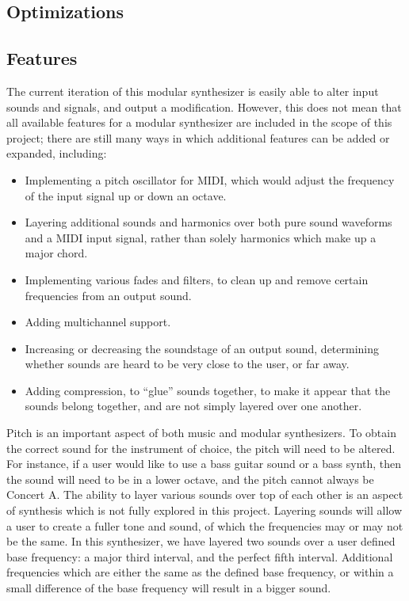 \subsection{Optimizations}

\subsection{Features}

The current iteration of this modular synthesizer is easily able to alter input sounds and signals, and output a modification. However, this does not mean that all available features for a modular synthesizer are included in the scope of this project; there are still many ways in which additional features can be added or expanded, including:

\begin{itemize}
	\item Implementing a pitch oscillator for MIDI, which would adjust the frequency of the input signal up or down an octave.
	\item Layering additional sounds and harmonics over both pure sound waveforms and a MIDI input signal, rather than solely harmonics which make up a major chord.
	\item Implementing various fades and filters, to clean up and remove certain frequencies from an output sound.
	\item Adding multichannel support. 
	\item Increasing or decreasing the soundstage of an output sound, determining whether sounds are heard to be very close to the user, or far away.
	\item Adding compression, to ``glue'' sounds together, to make it appear that the sounds belong together, and are not simply layered over one another.
\end{itemize}

Pitch is an important aspect of both music and modular synthesizers. To obtain the correct sound for the instrument of choice, the pitch will need to be altered. For instance, if a user would like to use a bass guitar sound or a bass synth, then the sound will need to be in a lower octave, and the pitch cannot always be Concert A. The ability to layer various sounds over top of each other is an aspect of synthesis which is not fully explored in this project. Layering sounds will allow a user to create a fuller tone and sound, of which the frequencies may or may not be the same. In this synthesizer, we have layered two sounds over a user defined base frequency: a major third interval, and the perfect fifth interval. Additional frequencies which are either the same as the defined base frequency, or within a small difference of the base frequency will result in a bigger sound.

